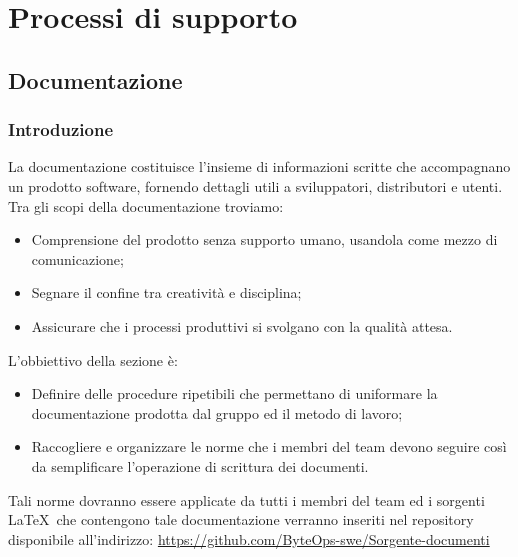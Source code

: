 \documentclass{article}
\begin{document}
\section{Processi di supporto}
\subsection{Documentazione}

\subsubsection{Introduzione}
La documentazione costituisce l'insieme di informazioni scritte che accompagnano un prodotto software, fornendo dettagli utili a sviluppatori, distributori e utenti.\\
Tra gli scopi della documentazione troviamo:
\begin{itemize}
    \item Comprensione del prodotto senza supporto umano, usandola come mezzo di comunicazione;
    \item Segnare il confine tra creatività e disciplina;
    \item Assicurare che i processi produttivi si svolgano con la qualità attesa.
\end{itemize}
L'obbiettivo della sezione è:
\begin{itemize}
    \item  Definire delle procedure ripetibili che permettano di uniformare la documentazione prodotta dal gruppo ed il metodo di lavoro;
    \item  Raccogliere e organizzare le norme che i membri del team devono seguire così da semplificare l'operazione di scrittura dei documenti.
\end{itemize}
Tali norme dovranno essere applicate da tutti i membri del team ed i sorgenti \LaTeX\ che contengono tale documentazione verranno inseriti nel repository disponibile all'indirizzo:
\href{https://github.com/ByteOps-swe/Sorgente-documenti}{https://github.com/ByteOps-swe/Sorgente-documenti}
\end{document}
